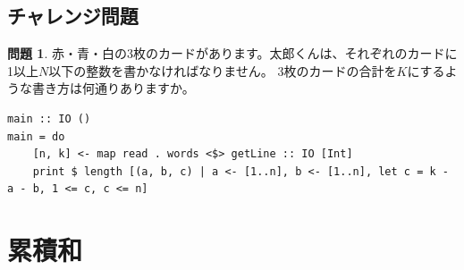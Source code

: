 \documentclass[12pt,a4paper,dvipdfmx,fleqn]{article}%
\theoremstyle{definition}
\newtheorem*{toi*}{問題}
\theoremstyle{definition}
\theoremstyle{definition}
\begin{document}
\subsection{チャレンジ問題}\label{チャレンジ問題1}
\begin{toi*}
    赤・青・白の3枚のカードがあります。太郎くんは、それぞれのカードに1以上$N$以下の整数を書かなければなりません。
    3枚のカードの合計を$K$にするような書き方は何通りありますか。
\end{toi*}
\begin{lstlisting}[caption=A05.hs,label=A05]
main :: IO ()
main = do
    [n, k] <- map read . words <$> getLine :: IO [Int]
    print $ length [(a, b, c) | a <- [1..n], b <- [1..n], let c = k - a - b, 1 <= c, c <= n]
\end{lstlisting}
\section{累積和}\label{累積和}
\end{document}
